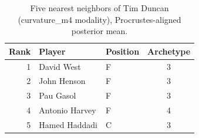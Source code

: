 \begin{table}[htbp]
  \centering\small
  \begin{tabular}{rllc}
    \toprule
    Rank & Player & Position & Archetype \\
    \midrule
    1 & David West & F & 3 \\
    2 & John Henson & F & 3 \\
    3 & Pau Gasol & F & 3 \\
    4 & Antonio Harvey & F & 4 \\
    5 & Hamed Haddadi & C & 3 \\
    \bottomrule
  \end{tabular}
  \caption{Five nearest neighbors of Tim Duncan (curvature_m4 modality), Procrustes-aligned posterior mean.}
  \label{tab:Tim_Duncan_neighbors_curvature_m4}
\end{table}

